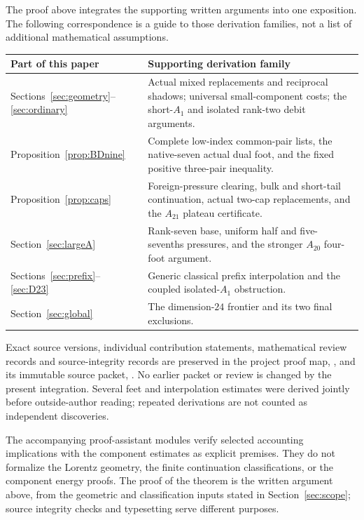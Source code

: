 \documentclass[11pt]{article}
\theoremstyle{remark}
\begin{document}
The proof above integrates the supporting written arguments into one
exposition. The following correspondence is a guide to those derivation
families, not a list of additional mathematical assumptions.
\begin{center}\small
\begin{tabular}{p{.26\linewidth}p{.64\linewidth}}
\toprule
Part of this paper & Supporting derivation family\\ \midrule
Sections~\ref{sec:geometry}--\ref{sec:ordinary}&
Actual mixed replacements and reciprocal shadows; universal small-component
costs; the short-$A_1$ and isolated rank-two debit arguments.\\
Proposition~\ref{prop:BDnine}&
Complete low-index common-pair lists, the native-seven actual dual foot,
and the fixed positive three-pair inequality.\\
Proposition~\ref{prop:caps}&
Foreign-pressure clearing, bulk and short-tail continuation,
actual two-cap replacements, and the $A_{21}$ plateau certificate.\\
Section~\ref{sec:largeA}&
Rank-seven base, uniform half and five-sevenths pressures,
and the stronger $A_{20}$ four-foot argument.\\
Sections~\ref{sec:prefix}--\ref{sec:D23}&
Generic classical prefix interpolation and the coupled isolated-$A_1$
obstruction.\\
Section~\ref{sec:global}&
The dimension-$24$ frontier and its two final exclusions.\\ \bottomrule
\end{tabular}\end{center}

Exact source versions, individual contribution statements, mathematical
review records and source-integrity records are preserved in the project
proof map, ,
and its immutable source packet,
.
No earlier packet or review is changed by the present integration.
Several feet and interpolation estimates were derived jointly before
outside-author reading; repeated derivations are not counted as
independent discoveries.

The accompanying proof-assistant modules verify selected accounting
implications with the component estimates as explicit premises.
They do not formalize the Lorentz geometry, the finite continuation
classifications, or the component energy proofs. The proof of the
theorem is the written argument above, from the geometric and
classification inputs stated in Section~\ref{sec:scope}; source
integrity checks and typesetting serve different purposes.
\end{document}

